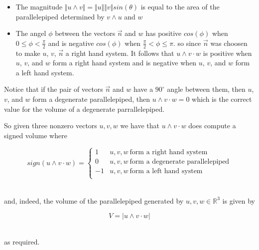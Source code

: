 \documentclass[12pt,letterpaper]{hmcpset}
\begin{document}
\begin{solution}
\begin{itemize}
\item The magnitude $\Vert u \wedge v \Vert = \Vert u \Vert \Vert v \Vert sin(\theta)$ is equal to the area of the parallelepiped determined by $v\wedge u$ and $w$

\item The  angel $\phi$ between the vectors $\vec{n}$ and $w$ has positive $cos(\phi)$ when $0\leq \phi < \frac{\pi}{2}$ and is negative $cos(\phi)$ when $\frac{\pi}{2} < \phi \leq \pi$.
so since $\vec{n}$ was choosen to make $u$, $v$, $\vec{n}$ a right hand system. It follows that $u\wedge v \cdot w$ is positive when $u$, $v$, and $w$ form a right hand system and is negative when $u$, $v$, and $w$ form a left hand system.

\end{itemize}

Notice that if the pair of vectors $\vec{n}$ and $w$ have a $90^{\circ}$ angle between them, then $u$, $v$, and $w$ form a degenerate parallelepiped, then $u\wedge v \cdot w = 0$ which is the correct value for the volume of a degenerate parrallelepiped.\\
\newpage


So given three nonzero vectors $u,v,w$ we have that $u\wedge v \cdot w$ does compute a signed volume where

\begin{equation*}
sign(u\wedge v \cdot w) = 
\begin{cases}
1 & u,v,w\ \text{form a right hand system}\\
0 & u,v,w \ \text{form a degenerate parallelepiped}\\
-1 & u,v,w \ \text{form a left hand system}\\
\end{cases}
\end{equation*}\

and, indeed, the volume of the parallelepiped generated by $u,v,w \in \mathbb{R}^3$ is given by

\[ V = \vert u\wedge v \cdot w \vert\]\

as required.



\end{solution}
\end{document}
